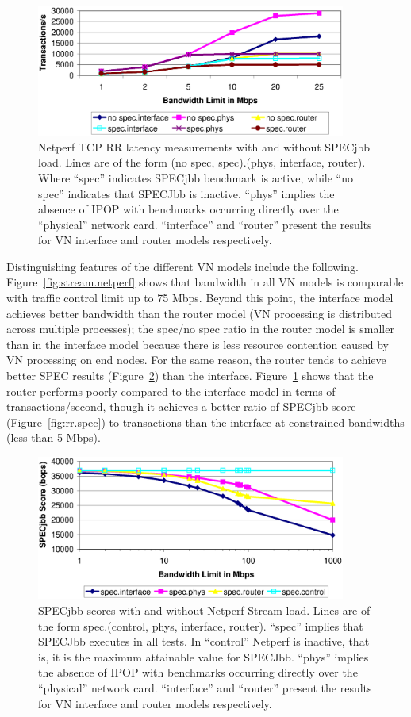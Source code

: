 \begin{figure}
\centering
\includegraphics[width=4in]{figs/rr.netperf.jpg.eps}
\caption[Grid Netperf latency evaluation]{Netperf TCP RR latency measurements
with and without SPECjbb load.  Lines are of the form (no spec, spec).(phys,
interface, router).  Where ``spec'' indicates SPECjbb benchmark is active,
while ``no spec'' indicates that SPECJbb is inactive. ``phys'' implies the
absence of IPOP with benchmarks occurring directly over the ``physical''
network card.  ``interface'' and ``router'' present the results for VN
interface and router models respectively.}
\label{fig:rr.netperf}
\end{figure}


Distinguishing features of the different VN models include the following.
Figure~\ref{fig:stream.netperf} shows that bandwidth in all VN models is
comparable with traffic control limit up to 75 Mbps. Beyond this point, the
interface model achieves better bandwidth than the router model (VN processing
is distributed across multiple processes); the spec/no spec ratio in the router
model is smaller than in the interface model because there is less resource
contention caused by VN processing on end nodes. For the same reason, the
router tends to achieve better SPEC results (Figure~\ref{fig:stream.spec}) than
the interface.  Figure~\ref{fig:rr.netperf} shows that the router performs
poorly compared to the interface model in terms of transactions/second, though
it achieves a better ratio of SPECjbb score (Figure~\ref{fig:rr.spec}) to
transactions than the interface at constrained bandwidths (less than 5 Mbps).

\begin{figure}
\centering
\includegraphics[width=4in]{figs/stream.spec.jpg.eps}
\caption[Grid SPECjbb evaluation, Stream load]{SPECjbb scores with and without
Netperf Stream load.  Lines are of the form spec.(control, phys, interface,
router).  ``spec'' implies that SPECJbb executes in all tests.  In ``control''
Netperf is inactive, that is, it is the maximum attainable value for SPECJbb.
``phys'' implies the absence of IPOP with benchmarks occurring directly over
the ``physical'' network card.  ``interface'' and ``router'' present the
results for VN interface and router models respectively.}
\label{fig:stream.spec}
\end{figure}


